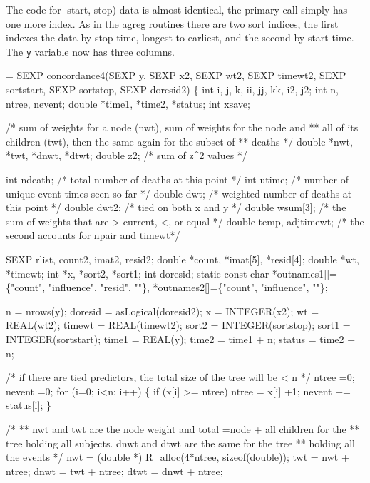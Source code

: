\documentclass{article}
\begin{document}
The code for [start, stop) data is almost identical, the primary call
simply has one more index.  
As in the agreg routines there are two sort indices, the first indexes
the data by stop time, longest to earliest, and the second by start time. 
The \Verb!y! variable now has three columns.
\begin{nwchunk}
=
     SEXP concordance4(SEXP y, SEXP x2, SEXP wt2, SEXP timewt2, 
                       SEXP sortstart, SEXP sortstop, SEXP doresid2) \{
     int i, j, k, ii, jj, kk, i2, j2;
     int n, ntree, nevent;
     double *time1, *time2, *status;
     int xsave; 
 
     /* sum of weights for a node (nwt), sum of weights for the node and
     **  all of its children (twt), then the same again for the subset of
     **  deaths
     */
     double *nwt, *twt, *dnwt, *dtwt;
     double z2;  /* sum of z^2 values */    
         
     int ndeath;   /* total number of deaths at this point */    
     int utime;    /* number of unique event times seen so far */
     double dwt;   /* weighted number of deaths at this point */
     double dwt2;  /* tied on both x and y */
     double wsum[3]; /* the sum of weights that are > current, <, or equal  */
     double temp, adjtimewt;  /* the second accounts for npair and timewt*/
 
     SEXP rlist, count2, imat2, resid2;
     double *count, *imat[5], *resid[4];
     double *wt, *timewt;
     int    *x, *sort2, *sort1;
     int doresid;
     static const char *outnames1[]=\{"count", "influence", "resid", ""\},
                       *outnames2[]=\{"count", "influence", ""\};
       
     n = nrows(y);
     doresid = asLogical(doresid2);
     x = INTEGER(x2);
     wt = REAL(wt2);
     timewt = REAL(timewt2);
     sort2 = INTEGER(sortstop);
     sort1 = INTEGER(sortstart);
     time1 = REAL(y);
     time2 = time1 + n;
     status = time2 + n;
    
     /* if there are tied predictors, the total size of the tree will be < n */
     ntree =0; nevent =0;
     for (i=0; i<n; i++) \{
         if (x[i] >= ntree) ntree = x[i] +1;  
         nevent += status[i];
     \}
         
     /*
     ** nwt and twt are the node weight and total =node + all children for the
     **  tree holding all subjects.  dnwt and dtwt are the same for the tree
     **  holding all the events
     */
     nwt = (double *) R_alloc(4*ntree, sizeof(double));
     twt = nwt + ntree;
     dnwt = twt + ntree;
     dtwt = dnwt + ntree;
     

\end{nwchunk}
\end{document}
